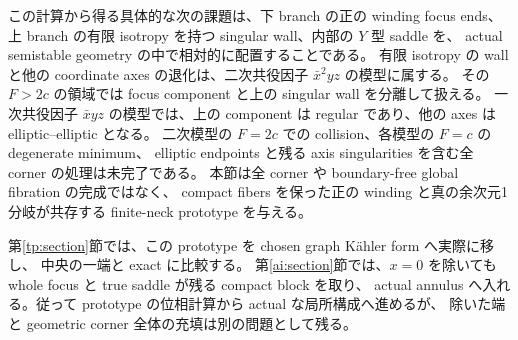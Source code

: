 この計算から得る具体的な次の課題は、下 branch の正の winding focus ends、
上 branch の有限 isotropy を持つ singular wall、内部の $Y$ 型 saddle を、
actual semistable geometry の中で相対的に配置することである。
有限 isotropy の wall と他の coordinate axes の退化は、二次共役因子 $\bar x^2yz$ の模型に属する。
その $F>2c$ の領域では focus component と上の singular wall を分離して扱える。
一次共役因子 $\bar xyz$ の模型では、上の component は regular であり、他の axes は elliptic--elliptic となる。
二次模型の $F=2c$ での collision、各模型の $F=c$ の degenerate minimum、
elliptic endpoints と残る axis singularities を含む全 corner の処理は未完了である。
本節は全 corner や boundary-free global fibration の完成ではなく、
compact fibers を保った正の winding と真の余次元1分岐が共存する finite-neck prototype を与える。


第\ref{tp:section}節では、この prototype を chosen graph Kähler form へ実際に移し、
中央の一端と exact に比較する。
第\ref{ai:section}節では、$x=0$ を除いても whole focus と true saddle が残る compact block を取り、
actual annulus へ入れる。従って prototype の位相計算から actual な局所構成へ進めるが、
除いた端と geometric corner 全体の充填は別の問題として残る。
